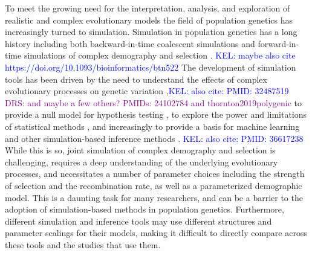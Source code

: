 \documentclass[hidelinks]{article}
\newcommand{\kelcomment}[1]{\textcolor{blue}{KEL: #1}}
\newcommand{\drscomment}[1]{\textcolor{purple}{DRS: #1}}
\begin{document}
    To meet the growing need for the interpretation,
    analysis, and exploration of realistic and complex evolutionary models
    the field of population genetics has increasingly turned to simulation.
    Simulation in population genetics has a long history 
    including both backward-in-time coalescent simulations
    \citep{kingman1982genealogy,hudson1983testing, hudson1990gene}
    and forward-in-time simulations of complex demography and selection
    \citep[e.g.,][]{gillespie1984molecular,thornton2014c++, haller2019slim}.  \kelcomment{maybe also cite https://doi.org/10.1093/bioinformatics/btn522}
    The development of simulation tools has been driven by the need to
    understand the effects of complex evolutionary processes on genetic
    variation \citep[e.g.,][]{galloway2020few},\kelcomment{also cite: PMID: 32487519 } \drscomment{and maybe a few others? PMIDs: 24102784 and thornton2019polygenic} to provide a null model for hypothesis testing
    \citep[e.g.,][]{hudson1992statistical,hudson1994evidence,sabeti2002detecting},
    to explore the power and limitations of statistical methods \citep[e.g.,][]{przeworski2002signature},
    and increasingly to provide a basis for machine learning and other
    simulation-based inference methods \citep[e.g.,][]{beaumont2002approximate,pavlidis2010searching,lin2011distinguishing,kern2018diplos,mughal2019localizing,sanchez2021deep,wang2021automatic}. \kelcomment{also cite: PMID: 36617238 }
    While this is so, joint simulation of complex demography and selection
    is challenging,  requires a deep understanding of the underlying
    evolutionary processes, and necessitates a number of parameter choices including
    the strength of selection and the
    recombination rate, as well as a parameterized demographic model.
    This is a daunting task for many researchers, and can be a barrier to
    the adoption of simulation-based methods in population genetics.
    Furthermore, different simulation and inference tools may use different structures
    and parameter scalings for their models,
    making it difficult to directly compare across these tools and the studies that use them.
    
\end{document}
